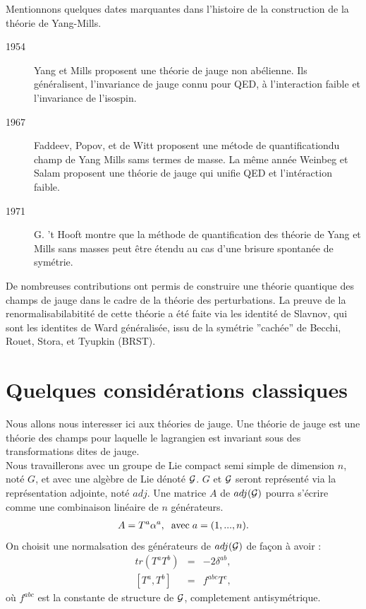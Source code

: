 \documentclass[a4paper,11pt]{article} %
\theoremstyle{plain}
\theoremstyle{definition}
\theoremstyle{remark}
\numberwithin{equation}{section}
\numberwithin{equation}{subsection}
\numberwithin{figure}{section}
\begin{document}
Mentionnons quelques dates marquantes dans l'histoire de la construction de la théorie de Yang-Mills.
\begin{description}
 \item[1954] Yang et Mills proposent une théorie de jauge non abélienne. Ils généralisent, l'invariance de jauge connu pour QED, à l'interaction faible et l'invariance de l'isospin.
 \item[1967] Faddeev, Popov, et de Witt proposent une métode de quantificationdu champ de Yang Mills sams termes de masse. La même année Weinbeg et Salam proposent une théorie de jauge qui unifie QED et l'intéraction faible.
 \item[1971] G. 't Hooft montre que la méthode de quantification des théorie de Yang et Mills sans masses peut être étendu au cas d'une brisure spontanée de symétrie.
\end{description}

De nombreuses contributions ont permis de construire une théorie quantique des champs de jauge dans le cadre de la théorie des perturbations. La preuve de la renormalisabilabitité de cette théorie a été faite via les identité de Slavnov, qui sont les identites de Ward généralisée, issu de la symétrie ''cachée'' de Becchi, Rouet, Stora, et Tyupkin (BRST). \\

\newpage

\section{Quelques considérations classiques}

\noindent
Nous allons nous interesser ici aux théories de jauge. Une théorie de jauge est une théorie des champs pour laquelle le lagrangien est invariant sous des transformations dites de jauge.\\
Nous travaillerons avec un groupe de Lie compact semi simple de dimension $n$, noté $G$, et avec une algèbre de Lie dénoté $\cal{G}$. $G$ et $\cal{G}$ seront représenté via la représentation adjointe, noté $adj$. Une matrice $A$ de $adj(\cal{G})$ pourra s'écrire comme une combinaison linéaire de $n$ générateurs. 
\begin{eqnarray*}
 A = T^{a} \alpha^{a}, \hspace{2mm} \text{avec} \hspace{1mm} a =(1,...,n).
\end{eqnarray*}
On choisit une normalsation des générateurs de $adj(\cal{G})$ de façon à avoir :
\begin{eqnarray*}
 tr( T^{a} T^{b} ) &=& -2 \delta^{ab} ,  \\
 \left [ T^{a} ,  T^{b} \right] &=& f^{abc} T^{c} ,
\end{eqnarray*}
où $f^{abc}$ est la constante de structure de $\cal{G}$, completement antisymétrique.
\end{document}
